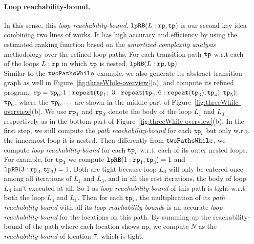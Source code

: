 \paragraph*{Loop reachability-bound.}
In this sense, this \emph{loop reachability-bound}, $\mathtt{lpRB}(L:\mathtt{rp}, \mathtt{tp})$ is our second key idea combining two lines of works.
It has high accuracy and efficiency by using the estimated ranking function based on the \emph{amortized complexity analysis} methodology over the refined loop paths.
For each transition path $\mathtt{tp}$ w.r.t each of the loops $L:\mathtt{rp}$ in which $\mathtt{tp}$ is nested,
$\mathtt{lpRB}(L:\mathtt{rp}, \mathtt{tp})$ 
\\
Similar to the $\mathtt{twoPathsWhile}$ example, we also generate its abstract transition graph as well in Figure~\ref{fig:threeWhile-overview}(a),
and compute its refined program,
$\mathtt{rp} = \mathtt{tp}_0; 1: \mathtt{repeat}(\mathtt{tp}_1;$ 
$3: {\mathtt{repeat}(\mathtt{tp}_2; 6 : {\mathtt{repeat}(\mathtt{tp}_3)}; \mathtt{tp}_4)}; \mathtt{tp}_5);$ 
$\mathtt{tp}_6$,
where the $\mathtt{tp}_0, \ldots$ are shown in the middle part of Figure~\ref{fig:threeWhile-overview}(b).
We use $\mathtt{rp}_1$ and $\mathtt{rp}_3$ denote the body of the loop $L_1$ and $L_3$ respectively as in the bottom part of Figure~\ref{fig:threeWhile-overview}(b).
In the first step, we still compute the \emph{path reachability-bound} for each $\mathtt{tp}_i$ but only w.r.t. the innermost loop it is nested.
Then differently from $\mathtt{twoPathsWhile}$,
we compute \emph{loop reachability-bound} for each $\mathtt{tp}_i$ w.r.t. each of its outer nested loops.
For example, for $\mathtt{tp}_3$ we compute
$\mathtt{lpRB}(1: \mathtt{rp}_1, \mathtt{tp}_3) = 1$ and
$\mathtt{lpRB}(3: \mathtt{rp}_3, \mathtt{tp}_3) = 1$.
Both are tight because loop $L_6$ will only be entered once among all iterations of $L_1$ and $L_3$, and in all the rest iterations, the body of loop $L_6$ isn't executed at all.
So $1$ as \emph{loop reachability-bound} of this path is tight w.r.t. both the loop $L_3$ and $L_1$.
Then for each $\mathtt{tp}_i$, the multiplication of its \emph{path reachability-bound} with all its \emph{loop reachability-bound}s is an accurate \emph{loop reachability-bound} for the locations on this path.
By summing up the reachability-bound of the path where each location shows up,
we compute $N$ as the \emph{reachability-bound} of location $7$, which is tight.

